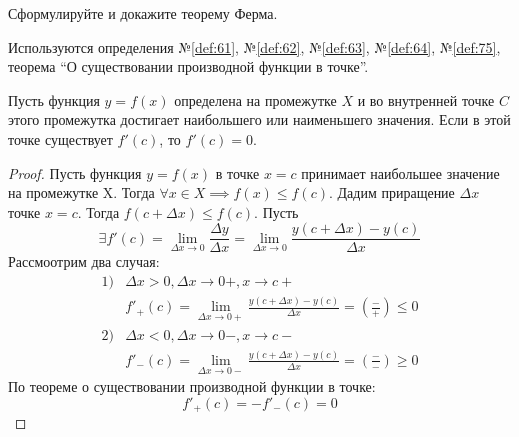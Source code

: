 \begin{question}
    Сформулируйте и докажите теорему Ферма.
\end{question}
\begin{used}
    Используются определения №\ref{def:61}, №\ref{def:62}, №\ref{def:63}, №\ref{def:64}, №\ref{def:75}, теорема ``О существовании производной функции в точке''.
\end{used}
\begin{theorem}
    Пусть функция $y = f(x)$ определена на промежутке $X$ и во внутренней точке $C$ этого промежутка достигает наибольшего или наименьшего значения. Если в этой точке существует $f'(c)$, то $f'(c) = 0$.
\end{theorem}
\begin{proof}
    Пусть функция $y = f(x)$ в точке  $x = c$ принимает наибольшее значение на промежутке X. Тогда $\forall x \in X \implies f(x) \le f(c)$. Дадим приращение $\Delta x$ точке $x = c$. Тогда $f(c + \Delta x) \le f(c)$. Пусть \[
        \exists f'(c) = \lim_{\Delta x \to 0} \frac{\Delta y}{\Delta x} = \lim_{\Delta x \to 0} \frac{y(c + \Delta x) - y(c)}{\Delta x}
    \]
    Рассмоотрим два случая:
    \begin{align*}
        1) &\Delta x > 0, \Delta x \to 0+, x \to c+ \\
        &f'_+(c) = \lim_{\Delta x \to 0+} \frac{y(c + \Delta x) - y(c)}{\Delta x} = \left( \frac{-}{+} \right) \le 0 \\
        2) &\Delta x < 0, \Delta x \to 0-, x \to c- \\
        &f'_-(c) = \lim_{\Delta x \to 0-} \frac{y(c + \Delta x) - y(c)}{\Delta x} = \left( \frac{-}{-} \right) \ge 0
    \end{align*}
    По теореме о существовании производной функции в точке: \[
        f'_+(c) = -f'_-(c) = 0
    \] 
\end{proof}
\pagebreak



